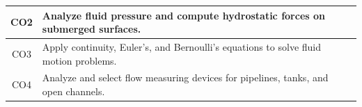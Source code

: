 \documentclass[12pt, a4paper]{article}
\begin{document}
\begin{center}
\begin{tabularx}{\textwidth}{|c|X|}
                                                                                                                                                                                                                                                                                                                        \hline
                                                                                                                                                                                                                                                                                                                                CO2 & Analyze fluid pressure and compute hydrostatic forces on submerged surfaces. \\
                                                                                                                                                                                                                                                                                                                                        \hline
                                                                                                                                                                                                                                                                                                                                                CO3 & Apply continuity, Euler's, and Bernoulli's equations to solve fluid motion problems. \\
                                                                                                                                                                                                                                                                                                                                                        \hline
                                                                                                                                                                                                                                                                                                                                                                CO4 & Analyze and select flow measuring devices for pipelines, tanks, and open channels. \\
                                                                                                                                                                                                                                                                                                                                                                        \hline

\end{tabularx}
\end{center}
\end{document}
